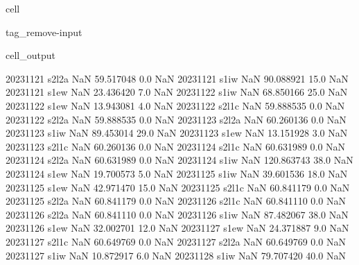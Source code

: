 \documentclass[letterpaper,10pt,english]{jupyterBook}
\begin{document}
\begin{sphinxuseclass}{cell}
\begin{sphinxuseclass}{tag_remove-input}
\begin{sphinxVerbatimOutput}
\begin{sphinxuseclass}{cell_output}
\begin{sphinxVerbatim}[commandchars=\\\{\}]
2023\PYGZhy{}11\PYGZhy{}21       s2\PYGZus{}l2a           NaN   59.517048     0.0         NaN
2023\PYGZhy{}11\PYGZhy{}21        s1\PYGZus{}iw           NaN   90.088921    15.0         NaN
2023\PYGZhy{}11\PYGZhy{}21        s1\PYGZus{}ew           NaN   23.436420     7.0         NaN
2023\PYGZhy{}11\PYGZhy{}22        s1\PYGZus{}iw           NaN   68.850166    25.0         NaN
2023\PYGZhy{}11\PYGZhy{}22        s1\PYGZus{}ew           NaN   13.943081     4.0         NaN
2023\PYGZhy{}11\PYGZhy{}22       s2\PYGZus{}l1c           NaN   59.888535     0.0         NaN
2023\PYGZhy{}11\PYGZhy{}22       s2\PYGZus{}l2a           NaN   59.888535     0.0         NaN
2023\PYGZhy{}11\PYGZhy{}23       s2\PYGZus{}l2a           NaN   60.260136     0.0         NaN
2023\PYGZhy{}11\PYGZhy{}23        s1\PYGZus{}iw           NaN   89.453014    29.0         NaN
2023\PYGZhy{}11\PYGZhy{}23        s1\PYGZus{}ew           NaN   13.151928     3.0         NaN
2023\PYGZhy{}11\PYGZhy{}23       s2\PYGZus{}l1c           NaN   60.260136     0.0         NaN
2023\PYGZhy{}11\PYGZhy{}24       s2\PYGZus{}l1c           NaN   60.631989     0.0         NaN
2023\PYGZhy{}11\PYGZhy{}24       s2\PYGZus{}l2a           NaN   60.631989     0.0         NaN
2023\PYGZhy{}11\PYGZhy{}24        s1\PYGZus{}iw           NaN  120.863743    38.0         NaN
2023\PYGZhy{}11\PYGZhy{}24        s1\PYGZus{}ew           NaN   19.700573     5.0         NaN
2023\PYGZhy{}11\PYGZhy{}25        s1\PYGZus{}iw           NaN   39.601536    18.0         NaN
2023\PYGZhy{}11\PYGZhy{}25        s1\PYGZus{}ew           NaN   42.971470    15.0         NaN
2023\PYGZhy{}11\PYGZhy{}25       s2\PYGZus{}l1c           NaN   60.841179     0.0         NaN
2023\PYGZhy{}11\PYGZhy{}25       s2\PYGZus{}l2a           NaN   60.841179     0.0         NaN
2023\PYGZhy{}11\PYGZhy{}26       s2\PYGZus{}l1c           NaN   60.841110     0.0         NaN
2023\PYGZhy{}11\PYGZhy{}26       s2\PYGZus{}l2a           NaN   60.841110     0.0         NaN
2023\PYGZhy{}11\PYGZhy{}26        s1\PYGZus{}iw           NaN   87.482067    38.0         NaN
2023\PYGZhy{}11\PYGZhy{}26        s1\PYGZus{}ew           NaN   32.002701    12.0         NaN
2023\PYGZhy{}11\PYGZhy{}27        s1\PYGZus{}ew           NaN   24.371887     9.0         NaN
2023\PYGZhy{}11\PYGZhy{}27       s2\PYGZus{}l1c           NaN   60.649769     0.0         NaN
2023\PYGZhy{}11\PYGZhy{}27       s2\PYGZus{}l2a           NaN   60.649769     0.0         NaN
2023\PYGZhy{}11\PYGZhy{}27        s1\PYGZus{}iw           NaN   10.872917     6.0         NaN
2023\PYGZhy{}11\PYGZhy{}28        s1\PYGZus{}iw           NaN   79.707420    40.0         NaN

\end{sphinxVerbatim}
\end{sphinxuseclass}
\end{sphinxVerbatimOutput}
\end{sphinxuseclass}
\end{sphinxuseclass}
\end{document}
